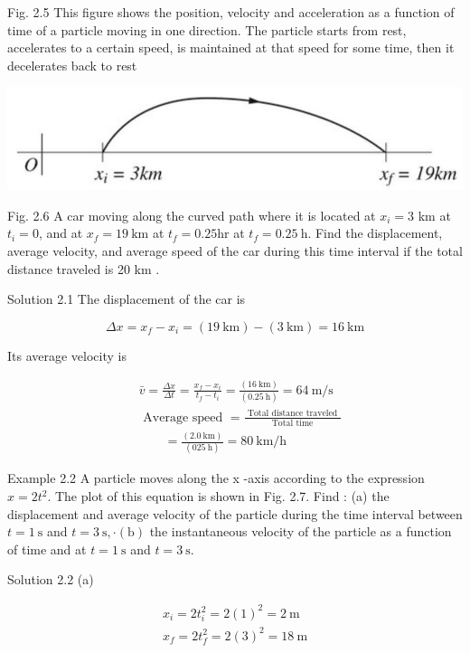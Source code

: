 \documentclass[10pt]{article}
\begin{document}
Fig. 2.5 This figure shows the position, velocity and acceleration as a function of time of a particle moving in one direction. The particle starts from rest, accelerates to a certain speed, is maintained at that speed for some time, then it decelerates back to rest

\begin{center}
\includegraphics[max width=\textwidth]{2024_09_13_db1f357d2aad0a03eb2eg-029(1)}
\end{center}

Fig. 2.6 A car moving along the curved path where it is located at $x_{i}=3$ km at $t_{i}=0$, and at $x_{f}=19 \mathrm{~km}$ at $t_{f}=0.25 \mathrm{hr}$ at $t_{f}=0.25 \mathrm{~h}$. Find the displacement, average velocity, and average speed of the car during this time interval if the total distance traveled is 20 km .

Solution 2.1 The displacement of the car is

$$
\Delta x=x_{f}-x_{i}=(19 \mathrm{~km})-(3 \mathrm{~km})=16 \mathrm{~km}
$$

Its average velocity is

$$
\begin{aligned}
& \bar{v}=\frac{\Delta x}{\Delta t}=\frac{x_{f}-x_{i}}{t_{f}-t_{i}}=\frac{(16 \mathrm{~km})}{(0.25 \mathrm{~h})}=64 \mathrm{~m} / \mathrm{s} \\
& \text { Average speed }=\frac{\text { Total distance traveled }}{\text { Total time }} \\
& \qquad=\frac{(2.0 \mathrm{~km})}{(025 \mathrm{~h})}=80 \mathrm{~km} / \mathrm{h}
\end{aligned}
$$

Example 2.2 A particle moves along the x -axis according to the expression $x=2 t^{2}$. The plot of this equation is shown in Fig. 2.7. Find : (a) the displacement and average velocity of the particle during the time interval between $t=1 \mathrm{~s}$ and $t=3 \mathrm{~s}, \cdot(\mathrm{b})$ the instantaneous velocity of the particle as a function of time and at $t=1 \mathrm{~s}$ and $t=3 \mathrm{~s}$.

Solution 2.2 (a)

$$
\begin{gathered}
x_{i}=2 t_{i}^{2}=2(1)^{2}=2 \mathrm{~m} \\
x_{f}=2 t_{f}^{2}=2(3)^{2}=18 \mathrm{~m}
\end{gathered}
$$
\end{document}
